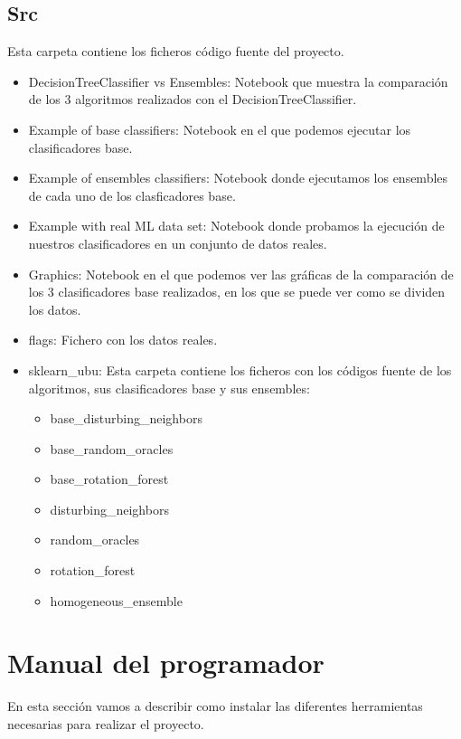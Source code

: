 \subsection{Src}
Esta carpeta contiene los ficheros código fuente del proyecto.
\begin{itemize}
	\item DecisionTreeClassifier vs Ensembles: Notebook que muestra la comparación de los 3 algoritmos realizados con el DecisionTreeClassifier.
	\item Example of base classifiers: Notebook en el que podemos ejecutar los clasificadores base.
	\item Example of ensembles classifiers: Notebook donde ejecutamos los ensembles de cada uno de los clasficadores base.
	\item Example with real ML data set: Notebook donde probamos la ejecución de nuestros clasificadores en un conjunto de datos reales.
	\item Graphics: Notebook en el que podemos ver las gráficas de la comparación de los 3 clasificadores base realizados, en los que se puede ver como se dividen los datos.
	\item flags: Fichero con los datos reales.
	\item sklearn\_ubu: Esta carpeta contiene los ficheros  con los códigos fuente de los algoritmos, sus clasificadores base y sus ensembles:
	\begin{itemize}
		\item base\_disturbing\_neighbors
		\item base\_random\_oracles
		\item base\_rotation\_forest
		\item disturbing\_neighbors
		\item random\_oracles
		\item rotation\_forest
		\item homogeneous\_ensemble
	\end{itemize}
\end{itemize}

\section{Manual del programador}
En esta sección vamos a describir como instalar las diferentes herramientas necesarias para realizar el proyecto.

